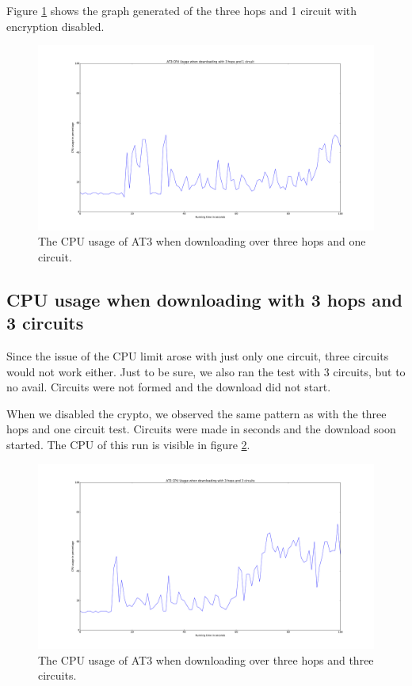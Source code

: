		Figure \ref{fig:cpu_3_hops_1_circuit} shows the graph generated of the three hops and 1 circuit with encryption disabled.
		
		\begin{figure}[!h]
			\centering
			\includegraphics[width=\textwidth]{graphics/cpu_usage_3_hops_1_circuit.pdf}
			\caption{The CPU usage of AT3 when downloading over three hops and one circuit.}
			\label{fig:cpu_3_hops_1_circuit}
		\end{figure}
		
	\subsection{CPU usage when downloading with 3 hops and 3 circuits}
		Since the issue of the CPU limit arose with just only one circuit, three circuits would not work either.
		Just to be sure, we also ran the test with 3 circuits, but to no avail. Circuits were not formed and the download did not start.
		
		When we disabled the crypto, we observed the same pattern as with the three hops and one circuit test. Circuits were made in seconds and the download soon started. The CPU of this run is visible in figure \ref*{fig:cpu_3_hops_3_circuits}.
		
		\begin{figure}[!h]
			\centering
			\includegraphics[width=\textwidth]{graphics/cpu_usage_3_hops_3_circuits.pdf}
			\caption{The CPU usage of AT3 when downloading over three hops and three circuits.}
			\label{fig:cpu_3_hops_3_circuits}
		\end{figure}
		
\newpage